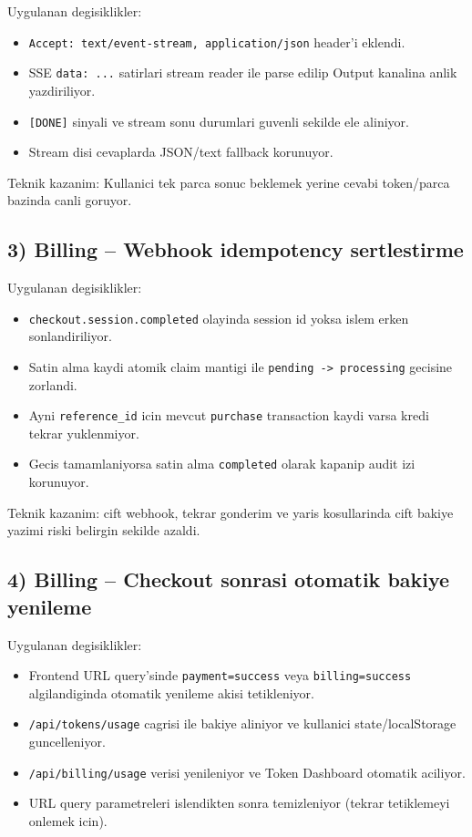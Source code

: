 \documentclass[11pt,a4paper]{article}
\begin{document}
Uygulanan degisiklikler:
\begin{itemize}[leftmargin=1.5em]
	\item \texttt{Accept: text/event-stream, application/json} header'i eklendi.
	\item SSE \texttt{data: ...} satirlari stream reader ile parse edilip Output kanalina anlik yazdiriliyor.
	\item \texttt{[DONE]} sinyali ve stream sonu durumlari guvenli sekilde ele aliniyor.
	\item Stream disi cevaplarda JSON/text fallback korunuyor.
\end{itemize}

Teknik kazanim: Kullanici tek parca sonuc beklemek yerine cevabi token/parca bazinda canli goruyor.

\subsection{3) Billing -- Webhook idempotency sertlestirme}

Uygulanan degisiklikler:
\begin{itemize}[leftmargin=1.5em]
	\item \texttt{checkout.session.completed} olayinda session id yoksa islem erken sonlandiriliyor.
	\item Satin alma kaydi atomik claim mantigi ile \texttt{pending -> processing} gecisine zorlandi.
	\item Ayni \texttt{reference\_id} icin mevcut \texttt{purchase} transaction kaydi varsa kredi tekrar yuklenmiyor.
	\item Gecis tamamlaniyorsa satin alma \texttt{completed} olarak kapanip audit izi korunuyor.
\end{itemize}

Teknik kazanim: cift webhook, tekrar gonderim ve yaris kosullarinda cift bakiye yazimi riski belirgin sekilde azaldi.

\subsection{4) Billing -- Checkout sonrasi otomatik bakiye yenileme}

Uygulanan degisiklikler:
\begin{itemize}[leftmargin=1.5em]
	\item Frontend URL query'sinde \texttt{payment=success} veya \texttt{billing=success} algilandiginda otomatik yenileme akisi tetikleniyor.
	\item \texttt{/api/tokens/usage} cagrisi ile bakiye aliniyor ve kullanici state/localStorage guncelleniyor.
	\item \texttt{/api/billing/usage} verisi yenileniyor ve Token Dashboard otomatik aciliyor.
	\item URL query parametreleri islendikten sonra temizleniyor (tekrar tetiklemeyi onlemek icin).
\end{itemize}
\end{document}
